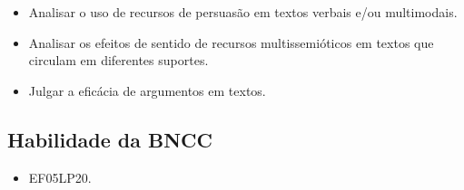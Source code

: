 \begin{itemize}
\item Analisar o uso de recursos de persuasão em textos verbais e/ou
multimodais.

\item Analisar os efeitos de sentido de recursos multissemióticos em textos
que circulam em diferentes suportes.

\item Julgar a eficácia de argumentos em textos.
\end{itemize}

\subsection{Habilidade da BNCC}

\begin{itemize}
\item EF05LP20.
\end{itemize}
	
